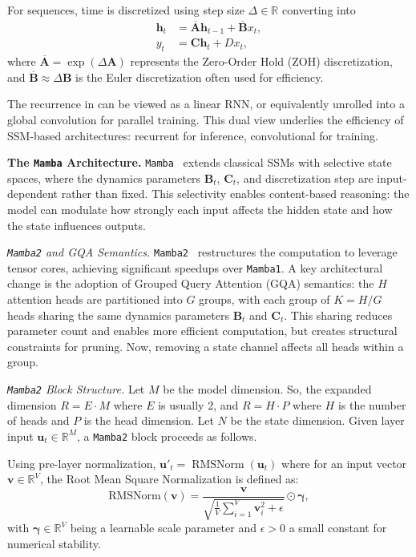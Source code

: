 \documentclass{article}
\theoremstyle{plain}
\theoremstyle{definition}
\theoremstyle{remark}
\begin{document}
For sequences, time is discretized using step size $\Delta \in \mathbb{R}$ converting  into
\begin{align}
\bm{h}_t &= \overline{\bm{A}}\bm{h}_{t-1} + \overline{\bm{B}}x_t, \label{eq:app_discrete_state} \\
y_t &= \bm{C}\bm{h}_t + D x_t, \label{eq:app_discrete_output}
\end{align}
where $\overline{\bm{A}} = \exp(\Delta \bm{A})$ represents the Zero-Order Hold (ZOH) discretization, and $\overline{\bm{B}} \approx \Delta \bm{B}$ is the Euler discretization often used for efficiency.

The recurrence in  can be viewed as a linear RNN, or equivalently unrolled into a global convolution for parallel training. This dual view underlies the efficiency of SSM-based architectures: recurrent for inference, convolutional for training.

\textbf{The \texttt{Mamba} Architecture.}
\texttt{Mamba}~\citep{gu2024mambalineartimesequencemodeling} extends classical SSMs with selective state spaces, where the dynamics parameters $\bm{B}_t$, $\bm{C}_t$, and discretization step are input-dependent rather than fixed. This selectivity enables content-based reasoning: the model can modulate how strongly each input affects the hidden state and how the state influences outputs.

\textit{\texttt{Mamba2} and GQA Semantics.}
\texttt{Mamba2}~\citep{dao_state_2024} restructures the computation to leverage tensor cores, achieving significant speedups over \texttt{Mamba1}. 
A key architectural change is the adoption of Grouped Query Attention (GQA) semantics: the $H$ attention heads are partitioned into $G$ groups, with each group of $K = H/G$ heads sharing the same dynamics parameters $\bm{B}_t$ and $\bm{C}_t$. This sharing reduces parameter count and enables more efficient computation, but creates structural constraints for pruning. Now, removing a state channel affects all heads within a group.

\textit{\texttt{Mamba2} Block Structure.}
Let $M$ be the model dimension. So, the expanded dimension $R = E \cdot M$ where $E$ is usually 2, and $R = H \cdot P$ where $H$ is the number of heads and $P$ is the head dimension. Let $N$ be the state dimension. Given layer input $\bm{u}_t \in \mathbb{R}^M$, a \texttt{Mamba2} block proceeds as follows.

Using pre-layer normalization, $\bm{u}'_t = \operatorname{RMSNorm} (\bm{u}_t)$ where for an input vector $\bm{v} \in \mathbb{R}^V$, the Root Mean Square Normalization is defined as:
\begin{equation*}
\text{RMSNorm}(\bm{v}) = \frac{\bm{v}}{\sqrt{\frac{1}{V} \sum_{i=1}^V \bm{v}_i^2 + \epsilon}} \odot \bm{\gamma},
\end{equation*}
with $\bm{\gamma} \in \mathbb{R}^V$ being a learnable scale parameter and $\epsilon > 0$ a small constant for numerical stability.
\end{document}
